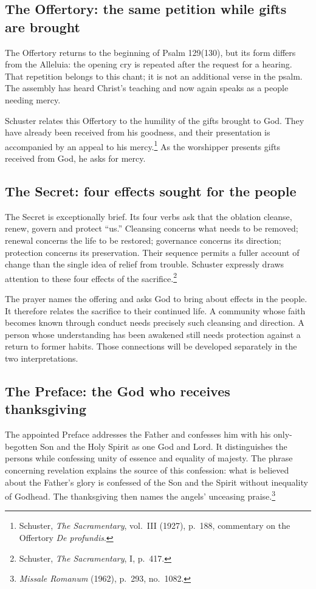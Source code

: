 \subsection{The Offertory: the same petition while gifts are brought}

The Offertory returns to the beginning of Psalm 129(130), but its form differs from the Alleluia: the opening cry is repeated after the request for a hearing. That repetition belongs to this chant; it is not an additional verse in the psalm. The assembly has heard Christ's teaching and now again speaks as a people needing mercy.

Schuster relates this Offertory to the humility of the gifts brought to God. They have already been received from his goodness, and their presentation is accompanied by an appeal to his mercy.\footnote{Schuster, \textit{The Sacramentary}, vol.~III (1927), p.~188, commentary on the Offertory \textit{De profundis}.} As the worshipper presents gifts received from God, he asks for mercy.

\subsection{The Secret: four effects sought for the people}

The Secret is exceptionally brief. Its four verbs ask that the oblation cleanse, renew, govern and protect ``us.'' Cleansing concerns what needs to be removed; renewal concerns the life to be restored; governance concerns its direction; protection concerns its preservation. Their sequence permits a fuller account of change than the single idea of relief from trouble. Schuster expressly draws attention to these four effects of the sacrifice.\footnote{Schuster, \textit{The Sacramentary}, I, p.~417.}

The prayer names the offering and asks God to bring about effects in the people. It therefore relates the sacrifice to their continued life. A community whose faith becomes known through conduct needs precisely such cleansing and direction. A person whose understanding has been awakened still needs protection against a return to former habits. Those connections will be developed separately in the two interpretations.

\subsection{The Preface: the God who receives thanksgiving}

The appointed Preface addresses the Father and confesses him with his only-begotten Son and the Holy Spirit as one God and Lord. It distinguishes the persons while confessing unity of essence and equality of majesty. The phrase concerning revelation explains the source of this confession: what is believed about the Father's glory is confessed of the Son and the Spirit without inequality of Godhead. The thanksgiving then names the angels' unceasing praise.\footnote{\textit{Missale Romanum} (1962), p.~293, no.~1082.}

